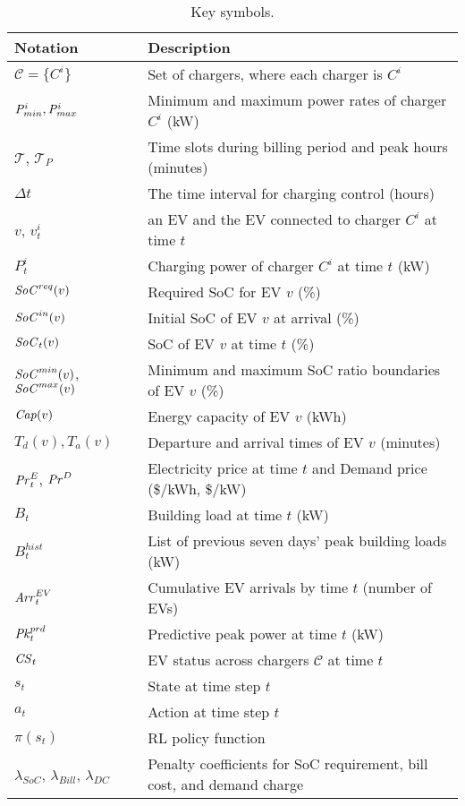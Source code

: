 \begin{table}[t]
    \centering
    \small
    \caption{Key symbols.}
    \begin{tabular}{|p{1.8cm}|p{6.0cm}|}
    \hline
    \textbf{Notation} & \textbf{Description} \\
    \hline
    $\mathcal{C}=\{C^i\}$ & Set of chargers, where each charger is $C^i$ \\ \hline
    ${\it P}^i_{min}, {\it P}^i_{max}$ & Minimum and maximum power rates of charger $C^i$ (kW) \\ \hline
    $\mathcal{T}$, $\mathcal{T}_{P}$ & Time slots during billing period and peak hours (minutes) \\ \hline
    $\Delta t $ & The time interval for charging control (hours) \\ \hline 
    $v$,  $v_t^i$& an EV and the EV connected to charger $C^i$ at time $t$  \\ \hline
    $P^i_t$ & Charging power of charger $C^i$ at time $t$ (kW) \\ \hline
    ${\it SoC}^{req}(v)$ & Required SoC for EV $v$ (\%) \\ \hline
    ${\it SoC}^{in}(v)$ & Initial SoC of EV $v$ at arrival (\%) \\ \hline
    ${\it SoC}_t(v)$ & SoC of EV $v$ at time $t$ (\%) \\ \hline
    ${\it SoC}^{min}(v)$, ${\it SoC}^{max}(v)$ & Minimum and maximum SoC ratio boundaries of EV $v$ (\%) \\ \hline
    ${\it Cap}(v)$ & Energy capacity of EV $v$ (kWh) \\ \hline
    $T_d(v), T_a(v)$ & Departure and arrival times of EV $v$ (minutes) \\ \hline
    ${\it Pr}^{E}_t$, ${\it Pr}^{D}$ & Electricity price at time $t$ and Demand price (\$/kWh, \$/kW) \\ \hline
    $B_t$ & Building load at time $t$ (kW) \\ \hline
    $ B^{hist}_t$ & List of previous seven days' peak building loads (kW) \\ \hline
    ${\it Arr}^{EV}_t$ & Cumulative EV arrivals by time $t$ (number of EVs) \\ \hline
    ${\it Pk}^{prd}_t$ & Predictive peak power at time $t$ (kW) \\ \hline 
    $\mathcal{\it CS}_{t}$ & EV status across chargers $ \mathcal{C} $ at time $t$ \\ \hline
    $s_t$ & State at time step $t$ \\ \hline
    $a_t$ & Action at time step $t$ \\ \hline
    $\pi(s_t)$ & RL policy function \\ \hline
    $\lambda_{SoC}$, $\lambda_{Bill}$, $\lambda_{DC}$ & Penalty coefficients for SoC requirement, bill cost, and demand charge \\ \hline
    \end{tabular}
    \label{table:notations}
\end{table} 